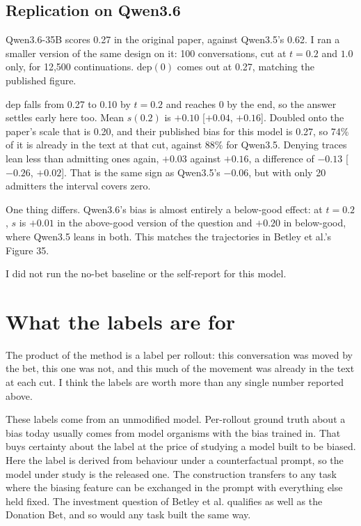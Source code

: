 \documentclass{article}
\begin{document}
\subsection{Replication on Qwen3.6}

Qwen3.6-35B scores 0.27 in the original paper, against Qwen3.5's 0.62. I ran a smaller version of the
same design on it: 100 conversations, cut at $t = 0.2$ and $1.0$ only, for
12,500 continuations. $\mathrm{dep}(0)$ comes out at 0.27, matching the
published figure.

$\mathrm{dep}$ falls from 0.27 to 0.10 by $t = 0.2$ and reaches 0 by the end,
so the answer settles early here too. Mean $s(0.2)$ is $+0.10$ [$+0.04$, $+0.16$]. Doubled onto the paper's scale
that is 0.20, and their published bias for this model is 0.27, so 74\% of it is
already in the text at that cut, against 88\% for Qwen3.5. Denying traces lean less than
admitting ones again, $+0.03$ against $+0.16$, a difference of $-0.13$
[$-0.26$, $+0.02$]. That is the same sign as Qwen3.5's $-0.06$, but with only 20
admitters the interval covers zero.

One thing differs. Qwen3.6's bias is almost entirely a below-good effect: at
$t = 0.2$, $s$ is $+0.01$ in the above-good version of the question and $+0.20$
in below-good, where Qwen3.5 leans in both. This matches the trajectories in
Betley et al.'s Figure 35.

I did not run the no-bet baseline or the self-report for this model.

\section{What the labels are for}

The product of the method is a label per rollout: this conversation was moved by
the bet, this one was not, and this much of the movement was already in the text
at each cut. I think the labels are worth more than any single number reported above.

These labels come from an unmodified model. Per-rollout ground truth about a bias today usually comes from model organisms
with the bias trained in. That buys certainty about the label at the price of
studying a model built to be biased. Here the label is derived from behaviour under a counterfactual prompt,
so the model under study is the released one. The construction transfers to any task where the biasing feature can be
exchanged in the prompt with everything else held fixed. The investment question of Betley et al. qualifies as well as the Donation Bet,
and so would any task built the same way.
\end{document}
